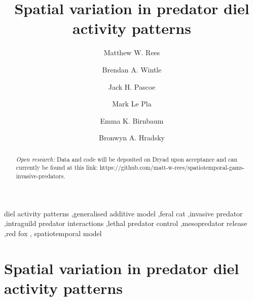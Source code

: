 \documentclass[preprint, 3p, authoryear]{elsarticle} %
\begin{document}
\begin{frontmatter}

  \title{Spatial variation in predator diel activity patterns}
    \author[UOM,CSIRO]{Matthew W. Rees%
  }
    \author[UOM]{Brendan A. Wintle%
  }
  
    \author[UOM,CEC]{Jack H. Pascoe%
  }
  
    \author[UOM,CEC]{Mark Le Pla%
  }
  
    \author[CEC]{Emma K. Birnbaum%
  }
  
    \author[UOM]{Bronwyn A. Hradsky%
  }
  
  
  \begin{abstract}
  \emph{Open research:} Data and code will be deposited on Dryad upon acceptance and can currently be found at this link: https://github.com/matt-w-rees/spatiotemporal-gams-invasive-predators.
  \end{abstract}
    \begin{keyword}
    diel activity patterns \sep generalised additive model \sep feral cat \sep invasive predator \sep intraguild predator interactions \sep lethal predator control \sep mesopredator release \sep red fox \sep 
    spatiotemporal model
  \end{keyword}
  
 \end{frontmatter}

\parskip=12pt 
\newpage
\setcounter{page}{1}

\hypertarget{spatial-variation-in-predator-diel-activity-patterns}{%
\section*{Spatial variation in predator diel activity patterns}\label{spatial-variation-in-predator-diel-activity-patterns}}

\(~\)
\end{document}
